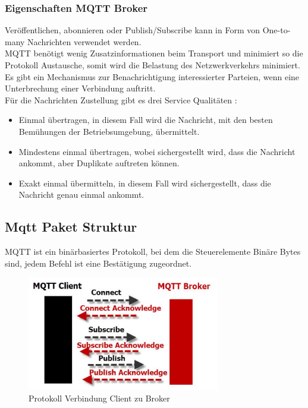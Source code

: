 \subsubsection{Eigenschaften MQTT Broker}
Veröffentlichen, abonnieren oder  Publish/Subscribe kann in Form von One-to-many Nachrichten verwendet werden.\\
MQTT benötigt wenig Zusatzinformationen beim Transport und minimiert so die Protokoll Austausche, somit wird die Belastung des Netzwerkverkehrs minimiert.\\
Es gibt ein Mechanismus zur Benachrichtigung interessierter Parteien, wenn eine Unterbrechung einer Verbindung auftritt.\\
Für die Nachrichten Zustellung gibt es drei Service Qualitäten \cite{noauthor_mqtt-v5.0.pdf_nodate}:\\
\begin{itemize}
	\item Einmal übertragen, in diesem Fall wird die Nachricht, mit den besten Bemühungen der Betriebsumgebung, übermittelt.\\
		\item Mindestens einmal übertragen, wobei sichergestellt wird, dass die Nachricht ankommt, aber Duplikate auftreten können.\\
	\item Exakt einmal übermitteln, in diesem Fall wird sichergestellt, dass die Nachricht genau einmal ankommt.
\end{itemize}

\subsection{Mqtt Paket Struktur}
MQTT ist ein binärbasiertes Protokoll, bei dem die Steuerelemente Binäre Bytes sind, jedem Befehl ist eine Bestätigung zugeordnet.

\begin{figure}[H]
	\centering
	\includegraphics[width=0.75\textwidth]{graphics/MQTTProtocolCommands.jpg}
	\caption{Protokoll Verbindung Client zu Broker} 	
	\label{pic: MQTTBrokerToClient}
\end{figure} 

